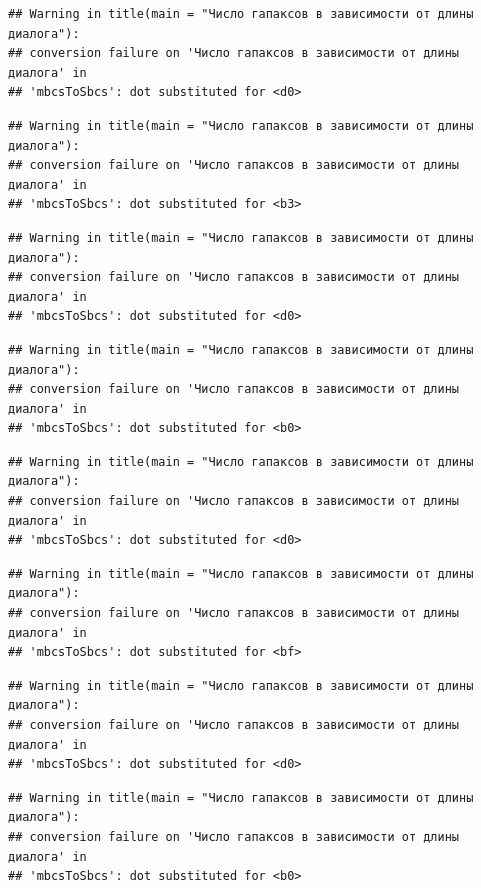 \documentclass[
]{book}
\theoremstyle{definition}
\theoremstyle{definition}
\theoremstyle{definition}
\theoremstyle{definition}
\theoremstyle{remark}
\begin{document}
\begin{verbatim}
## Warning in title(main = "Число гапаксов в зависимости от длины диалога"):
## conversion failure on 'Число гапаксов в зависимости от длины диалога' in
## 'mbcsToSbcs': dot substituted for <d0>
\end{verbatim}

\begin{verbatim}
## Warning in title(main = "Число гапаксов в зависимости от длины диалога"):
## conversion failure on 'Число гапаксов в зависимости от длины диалога' in
## 'mbcsToSbcs': dot substituted for <b3>
\end{verbatim}

\begin{verbatim}
## Warning in title(main = "Число гапаксов в зависимости от длины диалога"):
## conversion failure on 'Число гапаксов в зависимости от длины диалога' in
## 'mbcsToSbcs': dot substituted for <d0>
\end{verbatim}

\begin{verbatim}
## Warning in title(main = "Число гапаксов в зависимости от длины диалога"):
## conversion failure on 'Число гапаксов в зависимости от длины диалога' in
## 'mbcsToSbcs': dot substituted for <b0>
\end{verbatim}

\begin{verbatim}
## Warning in title(main = "Число гапаксов в зависимости от длины диалога"):
## conversion failure on 'Число гапаксов в зависимости от длины диалога' in
## 'mbcsToSbcs': dot substituted for <d0>
\end{verbatim}

\begin{verbatim}
## Warning in title(main = "Число гапаксов в зависимости от длины диалога"):
## conversion failure on 'Число гапаксов в зависимости от длины диалога' in
## 'mbcsToSbcs': dot substituted for <bf>
\end{verbatim}

\begin{verbatim}
## Warning in title(main = "Число гапаксов в зависимости от длины диалога"):
## conversion failure on 'Число гапаксов в зависимости от длины диалога' in
## 'mbcsToSbcs': dot substituted for <d0>
\end{verbatim}

\begin{verbatim}
## Warning in title(main = "Число гапаксов в зависимости от длины диалога"):
## conversion failure on 'Число гапаксов в зависимости от длины диалога' in
## 'mbcsToSbcs': dot substituted for <b0>
\end{verbatim}
\end{document}
